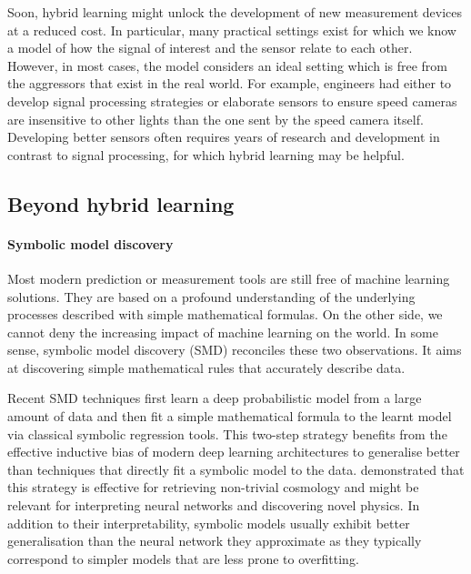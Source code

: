 Soon, hybrid learning might unlock the development of new measurement devices at a reduced cost. In particular, many practical settings exist for which we know a model of how the signal of interest and the sensor relate to each other. However, in most cases, the model considers an ideal setting which is free from the aggressors that exist in the real world. For example, engineers had either to develop signal processing strategies or elaborate sensors to ensure speed cameras are insensitive to other lights than the one sent by the speed camera itself. Developing better sensors often requires years of research and development in contrast to signal processing, for which hybrid learning may be helpful.

\subsection{Beyond hybrid learning}
\paragraph{Symbolic model discovery}
Most modern prediction or measurement tools are still free of machine learning solutions. They are based on a profound understanding of the underlying processes described with simple mathematical formulas. On the other side, we cannot deny the increasing impact of machine learning on the world. In some sense, symbolic model discovery (SMD) reconciles these two observations. It aims at discovering simple mathematical rules that accurately describe data.

Recent SMD techniques first learn a deep probabilistic model from a large amount of data and then fit a simple mathematical formula to the learnt model via classical symbolic regression tools. This two-step strategy benefits from the effective inductive bias of modern deep learning architectures to generalise better than techniques that directly fit a symbolic model to the data. \citet{cranmer2020discovering} demonstrated that this strategy is effective for retrieving non-trivial cosmology and might be relevant for interpreting neural networks and discovering novel physics. In addition to their interpretability, symbolic models usually exhibit better generalisation than the neural network they approximate as they typically correspond to simpler models that are less prone to overfitting.

